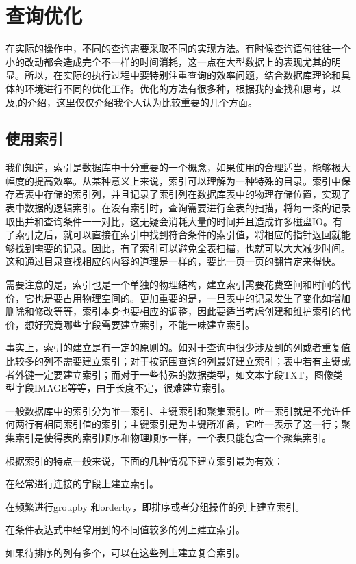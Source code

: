 \chapter{查询优化}
在实际的操作中，不同的查询需要采取不同的实现方法。有时候查询语句往往一个小的改动都会造成完全不一样的时间消耗，这一点在大型数据上的表现尤其的明显。所以，在实际的执行过程中要特别注重查询的效率问题，结合数据库理论和具体的环境进行不同的优化工作。优化的方法有很多种，根据我的查找和思考，以及\cite{youhua},\cite{youhuayanjiu}的介绍，这里仅仅介绍我个人认为比较重要的几个方面。

\section{使用索引}
我们知道，索引是数据库中十分重要的一个概念，如果使用的合理适当，能够极大幅度的提高效率。从某种意义上来说，索引可以理解为一种特殊的目录。索引中保存着表中存储的索引列，并且记录了索引列在数据库表中的物理存储位置，实现了表中数据的逻辑索引。在没有索引时，查询需要进行全表的扫描，将每一条的记录取出并和查询条件一一对比，这无疑会消耗大量的时间并且造成许多磁盘IO。有了索引之后，就可以直接在索引中找到符合条件的索引值，将相应的指针返回就能够找到需要的记录。因此，有了索引可以避免全表扫描，也就可以大大减少时间。这和通过目录查找相应的内容的道理是一样的，要比一页一页的翻肯定来得快。


需要注意的是，索引也是一个单独的物理结构，建立索引需要花费空间和时间的代价，它也是要占用物理空间的。更加重要的是，一旦表中的记录发生了变化如增加删除和修改等等，索引本身也要相应的调整，因此要适当考虑创建和维护索引的代价，想好究竟哪些字段需要建立索引，不能一味建立索引。


事实上，索引的建立是有一定的原则的。如对于查询中很少涉及到的列或者重复值比较多的列不需要建立索引；对于按范围查询的列最好建立索引；表中若有主键或者外键一定要建立索引；而对于一些特殊的数据类型，如文本字段TXT，图像类型字段IMAGE等等，由于长度不定，很难建立索引。


一般数据库中的索引分为唯一索引、主键索引和聚集索引。唯一索引就是不允许任何两行有相同索引值的索引；主键索引是为主键所准备，它唯一表示了这一行；聚集索引是使得表的索引顺序和物理顺序一样，一个表只能包含一个聚集索引。


根据索引的特点一般来说，下面的几种情况下建立索引最为有效：
\begin{compactitem}
\item
在经常进行连接的字段上建立索引。
\item
在频繁进行groupby 和orderby，即排序或者分组操作的列上建立索引。
\item
在条件表达式中经常用到的不同值较多的列上建立索引。
\item
如果待排序的列有多个，可以在这些列上建立复合索引。
\end{compactitem}

